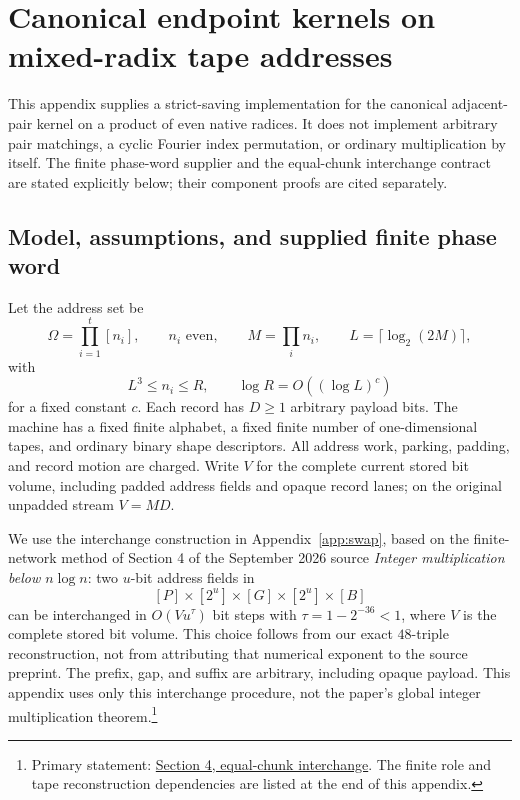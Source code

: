 \section{Canonical endpoint kernels on mixed-radix tape addresses}
\label{app:native-endpoint}

This appendix supplies a strict-saving implementation for the canonical
adjacent-pair kernel on a product of even native radices.  It does not
implement arbitrary pair matchings, a cyclic Fourier index permutation, or
ordinary multiplication by itself.  The finite phase-word supplier and the
equal-chunk interchange contract are stated explicitly below; their
component proofs are cited separately.

\subsection{Model, assumptions, and supplied finite phase word}

Let the address set be
\[
  \Omega=\prod_{i=1}^t[n_i],\qquad n_i\text{ even},\qquad
  M=\prod_i n_i,\qquad L=\lceil\log_2(2M)\rceil,
\]
with
\[
  L^3\le n_i\le R,\qquad \log R=O((\log L)^c)
\]
for a fixed constant $c$.  Each record has $D\ge1$ arbitrary payload
bits.  The machine has a fixed finite alphabet, a fixed finite number of
one-dimensional tapes, and ordinary binary shape descriptors.  All address
work, parking, padding, and record motion are charged.  Write $V$ for the
complete current stored bit volume, including padded address fields and
opaque record lanes; on the original unpadded stream $V=MD$.

We use the interchange construction in Appendix~\ref{app:swap}, based
on the finite-network method of Section 4 of the September 2026 source
\emph{Integer multiplication below $n\log n$}: two $u$-bit
address fields in
\[
 [P]\times[2^u]\times[G]\times[2^u]\times[B]
\]
can be interchanged in $O(Vu^\tau)$ bit steps with
$\tau=1-2^{-36}<1$, where $V$ is the complete stored bit volume. This
choice follows from our exact $48$-triple reconstruction, not from
attributing that numerical exponent to the source preprint. The
prefix, gap, and suffix are arbitrary, including opaque payload.  This
appendix uses only this interchange procedure, not the paper's global
integer multiplication theorem.\footnote{Primary statement: \href{https://raw.githubusercontent.com/openai/math/4eaee87548250b2682affda7d05d947c05554bae/preprints/Integer-multiplication-below-n-log-n-September-23-2026/build/sections/04-swap.tex}{Section 4, equal-chunk interchange}. The finite role and tape reconstruction dependencies are listed at the end of this appendix.}

